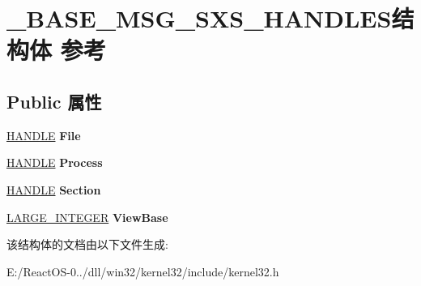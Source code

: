 \hypertarget{struct___b_a_s_e___m_s_g___s_x_s___h_a_n_d_l_e_s}{}\section{\+\_\+\+B\+A\+S\+E\+\_\+\+M\+S\+G\+\_\+\+S\+X\+S\+\_\+\+H\+A\+N\+D\+L\+E\+S结构体 参考}
\label{struct___b_a_s_e___m_s_g___s_x_s___h_a_n_d_l_e_s}
\subsection*{Public 属性}
\begin{DoxyCompactItemize}
\item 
\mbox{\label{struct___b_a_s_e___m_s_g___s_x_s___h_a_n_d_l_e_s_a8e9b0a1da7d778ff3e1d7c39d8302b3e}} 
\hyperlink{interfacevoid}{H\+A\+N\+D\+LE} {\bfseries File}
\item 
\mbox{\label{struct___b_a_s_e___m_s_g___s_x_s___h_a_n_d_l_e_s_adb6d8e681f8d9c8d6a8871b1e91ac797}} 
\hyperlink{interfacevoid}{H\+A\+N\+D\+LE} {\bfseries Process}
\item 
\mbox{\label{struct___b_a_s_e___m_s_g___s_x_s___h_a_n_d_l_e_s_a1927fd23a5b3d427e68b1bbf33446ca8}} 
\hyperlink{interfacevoid}{H\+A\+N\+D\+LE} {\bfseries Section}
\item 
\mbox{\label{struct___b_a_s_e___m_s_g___s_x_s___h_a_n_d_l_e_s_aef08416c407b8b12449c26e21c1e0017}} 
\hyperlink{union___l_a_r_g_e___i_n_t_e_g_e_r}{L\+A\+R\+G\+E\+\_\+\+I\+N\+T\+E\+G\+ER} {\bfseries View\+Base}
\end{DoxyCompactItemize}


该结构体的文档由以下文件生成\+:\begin{DoxyCompactItemize}
\item 
E\+:/\+React\+O\+S-\/0../dll/win32/kernel32/include/kernel32.\+h\end{DoxyCompactItemize}
